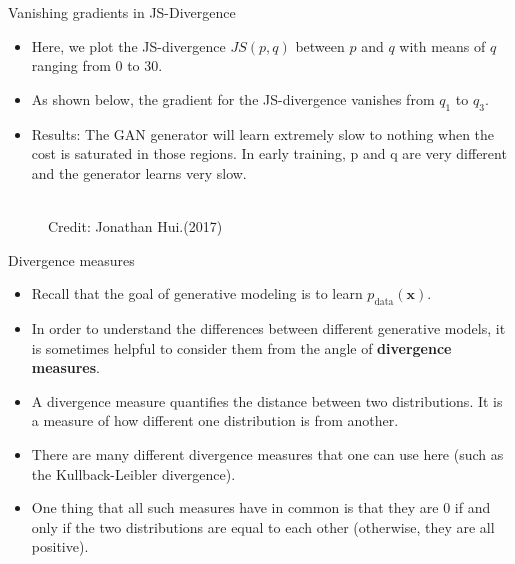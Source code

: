 \begin{frame} {Vanishing gradients in JS-Divergence}
    \vspace{2mm}
    \begin{itemize}
        \item Here, we plot the JS-divergence $JS(p, q)$ between $p$ and $q$ with means of $q$ ranging from 0 to 30. 
\item As shown below, the gradient for the JS-divergence vanishes from $q_1$ to $q_3$.\\
\item Results: The GAN generator will learn extremely slow to nothing when the cost is saturated in those regions. In early training, p and q are very different and the generator learns very slow.
  \end{itemize}

    \begin{figure}
    \centering
      \tiny{\\Credit: Jonathan Hui.(2017)}
  \end{figure}

\end{frame}



\begin{frame} {Divergence measures}
  \begin{itemize}
    \item Recall that the goal of generative modeling is to learn $p_{\text{data}}(\mathbf{x})$.
    \vspace{2mm}
    \item In order to understand the differences between different generative models, it is sometimes helpful to consider them from the angle of \textbf{divergence measures}.
    \vspace{2mm}
    \item A divergence measure quantifies the distance between two distributions. It is a measure of how different one distribution is from another.
    \vspace{2mm}
    \item There are many different divergence measures that one can use here (such as the Kullback-Leibler divergence).
    \vspace{2mm}
    \item One thing that all such measures have in common is that they are 0 if and only if the two distributions are equal to each other (otherwise, they are all positive).
  \end{itemize}
\end{frame}

